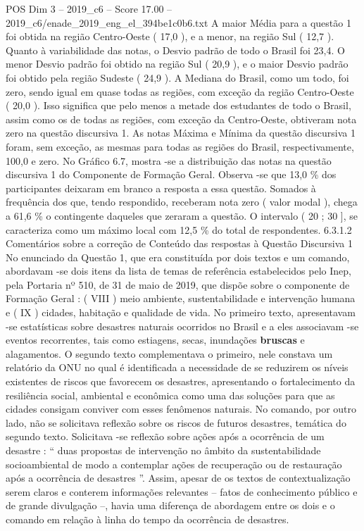 \begin{textsample}{POS Dim 3 – 2019\_c6 – Score 17.00 – 2019\_c6/enade\_2019\_eng\_el\_394be1c0b6.txt}
A maior Média para a questão 1 foi obtida na região Centro-Oeste ( 17,0 ), e a menor, na região Sul ( 12,7 ).
Quanto à variabilidade das notas, o Desvio padrão de todo o Brasil foi 23,4.
O menor Desvio padrão foi obtido na região Sul ( 20,9 ), e o maior Desvio padrão foi obtido pela região Sudeste ( 24,9 ).
A Mediana do Brasil, como um todo, foi zero, sendo igual em quase todas as regiões, com exceção da região Centro-Oeste ( 20,0 ).
Isso significa que pelo menos a metade dos estudantes de todo o Brasil, assim como os de todas as regiões, com exceção da Centro-Oeste, obtiveram nota zero na questão discursiva 1.
As notas Máxima e Mínima da questão discursiva 1 foram, sem exceção, as mesmas para todas as regiões do Brasil, respectivamente, 100,0 e zero.
No Gráfico 6.7, mostra -se a distribuição das notas na questão discursiva 1 do Componente de Formação Geral.
Observa -se que 13,0 \% dos participantes deixaram em branco a resposta a essa questão.
Somados à frequência dos que, tendo respondido, receberam nota zero ( valor modal ), chega a 61,6 \% o contingente daqueles que zeraram a questão.
O intervalo ( 20 ; 30 ], se caracteriza como um máximo local com 12,5 \% do total de respondentes. 6.3.1.2 Comentários sobre a correção de Conteúdo das respostas à Questão Discursiva 1 No enunciado da Questão 1, que era constituída por dois textos e um comando, abordavam -se dois itens da lista de temas de referência estabelecidos pelo Inep, pela Portaria nº 510, de 31 de maio de 2019, que dispõe sobre o componente de Formação Geral : ( VIII ) meio ambiente, sustentabilidade e intervenção humana e ( IX ) cidades, habitação e qualidade de vida.
No primeiro texto, apresentavam -se estatísticas sobre desastres naturais ocorridos no Brasil e a eles associavam -se eventos recorrentes, tais como estiagens, secas, inundações \textbf{bruscas} e alagamentos.
O segundo texto complementava o primeiro, nele constava um relatório da ONU no qual é identificada a necessidade de se reduzirem os níveis existentes de riscos que favorecem os desastres, apresentando o fortalecimento da resiliência social, ambiental e econômica como uma das soluções para que as cidades consigam conviver com esses fenômenos naturais.
No comando, por outro lado, não se solicitava reflexão sobre os riscos de futuros desastres, temática do segundo texto.
Solicitava -se reflexão sobre ações após a ocorrência de um desastre : “ duas propostas de intervenção no âmbito da sustentabilidade socioambiental de modo a contemplar ações de recuperação ou de restauração após a ocorrência de desastres ”.
Assim, apesar de os textos de contextualização serem claros e conterem informações relevantes – fatos de conhecimento público e de grande divulgação –, havia uma diferença de abordagem entre os dois e o comando em relação à linha do tempo da ocorrência de desastres.

\end{textsample}
